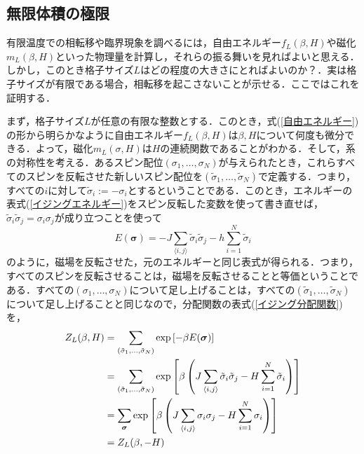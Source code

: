 \documentclass[a4paper,11pt]{jsreport}
\begin{document}
\subsection{無限体積の極限}
有限温度での相転移や臨界現象を調べるには，自由エネルギー$f_L(\beta, H)$や磁化$m_L(\beta, H)$といった物理量を計算し，それらの振る舞いを見ればよいと思える．しかし，このとき格子サイズ$L$はどの程度の大きさにとればよいのか？．実は格子サイズが有限である場合，相転移を起こさないことが示せる．ここではこれを証明する．\par
まず，格子サイズ$L$が任意の有限な整数とする．このとき，式(\ref{自由エネルギー})の形から明らかなように自由エネルギー$f_L(\beta, H)$は$\beta, H$について何度も微分できる．よって，磁化$m_L(\sigma, H)$は$H$の連続関数であることがわかる．そして，系の対称性を考える．あるスピン配位$(\sigma_1,\dots,\sigma_N)$が与えられたとき，これらすべてのスピンを反転させた新しいスピン配位を$(\tilde{\sigma}_1,\dots,\tilde{\sigma}_N)$で定義する．つまり，すべての$i$に対して$\tilde{\sigma}_i := -\sigma_i$とするということである．このとき，エネルギーの表式(\ref{イジングエネルギー})をスピン反転した変数を使って書き直せば，$\tilde{\sigma}_i \tilde{\sigma}_j = \sigma_i \sigma_j$が成り立つことを使って
\begin{equation}
  E(\bm{\sigma}) = -J \sum_{\langle i,j \rangle} \tilde{\sigma}_i \tilde{\sigma}_j -h \sum_{i=1}^{N} \tilde{\sigma}_i
\end{equation}
のように，磁場を反転させた，元のエネルギーと同じ表式が得られる．つまり，すべてのスピンを反転させることは，磁場を反転させることと等価ということである．すべての$(\sigma_1,\dots,\sigma_N)$について足し上げることは，すべての$(\tilde{\sigma}_1,\dots,\tilde{\sigma}_N)$について足し上げることと同じなので，分配関数の表式(\ref{イジング分配関数})を，
\begin{align}
  Z_L(\beta, H)
   & = \sum_{(\tilde{\sigma}_1,\dots,\tilde{\sigma}_N)} \exp{[-\beta E(\bm{\sigma})]} \notag                                                                                               \\
   & = \sum_{(\tilde{\sigma}_1,\dots,\tilde{\sigma}_N)} \exp{\left[ \beta\left( J \sum_{\langle i,j \rangle} \tilde{\sigma}_i \tilde{\sigma}_j -H \sum_{i=1}^{N} \tilde{\sigma}_i \right) \right]} \notag \\
   & = \sum_{\bm{\sigma}} \exp{\left[ \beta\left( J \sum_{\langle i,j \rangle} \sigma_i \sigma_j -H \sum_{i=1}^{N} \sigma_i \right) \right]} \notag                                         \\
   & = Z_L(\beta, -H)
\end{align}
\end{document}
